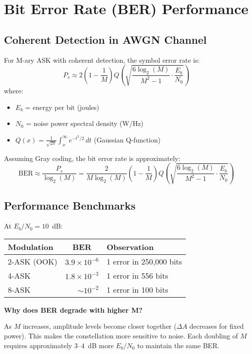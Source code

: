 \section{Bit Error Rate (BER) Performance}

\subsection{Coherent Detection in AWGN Channel}

For M-ary ASK with coherent detection, the symbol error rate is:
\begin{equation}
P_s \approx 2\left(1 - \frac{1}{M}\right) Q\left(\sqrt{\frac{6\log_2(M)}{M^2 - 1} \cdot \frac{E_b}{N_0}}\right)
\end{equation}
where:
\begin{itemize}
\item $E_b$ = energy per bit (joules)
\item $N_0$ = noise power spectral density (W/Hz)
\item $Q(x) = \frac{1}{\sqrt{2\pi}}\int_x^\infty e^{-t^2/2}\,dt$ (Gaussian Q-function)
\end{itemize}

Assuming Gray coding, the bit error rate is approximately:
\begin{equation}
\mathrm{BER} \approx \frac{P_s}{\log_2(M)} = \frac{2}{M\log_2(M)}\left(1 - \frac{1}{M}\right) Q\left(\sqrt{\frac{6\log_2(M)}{M^2 - 1} \cdot \frac{E_b}{N_0}}\right)
\end{equation}

\subsection{Performance Benchmarks}

At $E_b/N_0 = 10$~dB:

\begin{center}
\begin{tabular}{@{}lrl@{}}
\toprule
Modulation & \multicolumn{1}{c}{BER} & Observation \\
\midrule
2-ASK (OOK) & $3.9 \times 10^{-6}$ & 1 error in 250,000 bits \\
4-ASK & $1.8 \times 10^{-3}$ & 1 error in 556 bits \\
8-ASK & $\sim 10^{-2}$ & 1 error in 100 bits \\
\bottomrule
\end{tabular}
\end{center}

\begin{keyconcept}
\textbf{Why does BER degrade with higher M?}

As $M$ increases, amplitude levels become closer together ($\Delta A$ decreases for fixed power). This makes the constellation more sensitive to noise. Each doubling of $M$ requires approximately 3--4~dB more $E_b/N_0$ to maintain the same BER.
\end{keyconcept}

